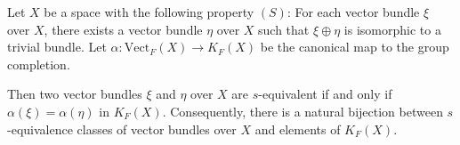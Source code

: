 Let $X$ be a space with the following property $(S)$: For each vector bundle $\xi$ over $X$, there exists a vector bundle $\eta$ over $X$ such that $\xi \oplus \eta$ is isomorphic to a trivial bundle. Let $\alpha: \text{Vect}_F(X) \to K_F(X)$ be the canonical map to the group completion.

Then two vector bundles $\xi$ and $\eta$ over $X$ are $s$-equivalent if and only if $\alpha(\xi) = \alpha(\eta)$ in $K_F(X)$. Consequently, there is a natural bijection between $s$-equivalence classes of vector bundles over $X$ and elements of $K_F(X)$.
